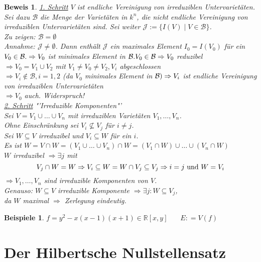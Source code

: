 \documentclass[a4paper,12pt]{report}
\theoremstyle{break}
\newtheorem{Bsp}[Def]{Beispiele}
\theoremstyle{nonumberbreak}
\theoremstyle{nonumberplain}
\newtheorem{Bew}{Beweis}
\newcommand{\defeqr}[0]{\mathrel{\mathop:}=}
\begin{document}
\begin{Bew}
\underline{1. Schritt} $V$ ist endliche Vereinigung von irreduziblen Untervarietäten.\\
Sei dazu $\mathcal{B}$ die Menge der Varietäten in $k^n$, die nicht endliche Vereinigung von irreduziblen Untervarietäten sind. Sei weiter $\mathcal{J}:=\{ I(V)\mid V\in \mathcal{B}\}$.\\
Zu zeigen: $\mathcal{B}=\emptyset$\\
Annahme: $\mathcal{J}\neq \emptyset$. Dann enthält $\mathcal{J}$ ein maximales Element $I_0=I(V_0)$ für ein $V_0\in \mathcal{B}.\\
\Rightarrow V_0$ ist minimales Element in $\mathcal{B}.\\
V_0 \in \mathcal{B} \Rightarrow V_0$ reduzibel\\
$\Rightarrow V_0 = V_1 \cup V_2$ mit $V_1\neq V_0\neq V_2, V_i$ abgeschlossen\\
$\Rightarrow V_i \notin\mathcal{B}, i=1,2$ (da $V_0$ minimales Element in $\mathcal{B})\\
\Rightarrow V_i$ ist endliche Vereinigung von irreduziblen Untervarietäten\\
$\Rightarrow V_0$ auch. Widerspruch!\\
\underline{2. Schritt} "'Irreduzible Komponenten"'\\
Sei $V=V_1\cup \dots \cup V_n$ mit irreduziblen Varietäten $V_1,\dots, V_n$.
\\Ohne Einschränkung sei $V_i\nsubseteq V_j$ für $i\neq j$.\\
Sei $W\subseteq V$ irreduzibel und $V_i\subseteq W$ für ein $i$.\\
Es ist $W=V\cap W= (V_1 \cup \dots \cup V_n)\cap W= (V_1 \cap W)\cup \dots \cup (V_n \cap W)$\\
$W$ irreduzibel $\Rightarrow\exists j$ mit 
\[
V_j\cap W = W\\
\Rightarrow V_i \subseteq W= W \cap V_j\subseteq V_j\Rightarrow i=j \text{ und } W=V_i
\]
$\Rightarrow V_1,\dots, V_n$ sind irreduzible Komponenten von $V$.\\
Genauso: $W\subseteq V$ irreduzible Komponente $\Rightarrow \exists j : W \subseteq V_j$,\\
da $W$ maximal $\Rightarrow$ Zerlegung eindeutig.
\end{Bew}
\begin{Bsp}
$f=y^2-x(x-1)(x+1) \in\mathbb{R}[x,y]~~~~~~~~E\defeqr V(f)$
\end{Bsp}
\section{Der Hilbertsche Nullstellensatz}
\end{document}
